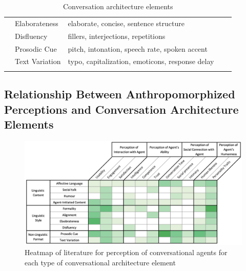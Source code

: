 \documentclass[sigconf,screen,review, anonymous]{acmart}
\newcommand{\cmt}[1]{}%
\begin{document}
\begin{table}[h]
{\begin{tabular}{@{}p{} | p{} | p{} | >{\centering}p{} | p{} @{}}
\\ \cline{2-5}
& Elaborateness & elaborate, concise, sentence structure & 6
& \cite{haas2022keep}\cmt{[78]}\cite{miehle2018exploring}\cmt{[51]}\cite{moilanen2022measuring}\cmt{[82]}\cite{roy2021users}\cmt{[71]}\cite{volkel2021manipulating}\cmt{[68]}\cite{volkel2022user}\cmt{[75]}
\\ \cline{2-5}
& Disfluency & fillers, interjections, repetitions & 6
& \cite{ceha2022expressive}\cmt{[77]}\cite{hu2021enhancing}\cmt{[56]}\cite{jeong2019exploring}\cmt{[10]}\cite{niewiadomski2013laugh}\cmt{[85]}\cite{wester2015artificial}\cmt{[14]}\cite{yang2021effect}\cmt{[72]}
\\ \Xhline{1.2pt}
\multirow{2}{*}{Non-Linguistic Format} & Prosodic Cue & pitch, intonation, speech rate, spoken accent & 12
& \cite{chan2021kinvoices}\cmt{[74]}\cite{choi2020nobody}\cmt{[54]}\cite{dubiel2020persuasive}\cmt{[60]}\cite{feijoo2021effects}\cmt{[70]}\cite{habler2019effects}\cmt{[63]}\cite{hu2021enhancing}\cmt{[56]}\cite{jestin2022effects}\cmt{[81]}\cite{kim2020can}\cmt{[24]}\cite{lubold2016effects}\cmt{[86]}\cite{misu2011toward}\cmt{[83]}\cite{tolmeijer2021female}\cmt{[62]}\cite{zhu2022effects}\cmt{[26]}
\\ \cline{2-5}
& Text Variation & typo, capitalization, emoticons, response delay & 9
& \cite{fadhil2018effect}\cmt{[52]}\cite{gnewuch2018faster}\cmt{[19]}\cite{gnewuch2018chatbot}\cmt{[21]}\cite{gnewuch2022opposing}\cmt{[20]}\cite{kim2019comparing}\cmt{[89]}\cite{seeger2021chatbots}\cmt{[35]}\cite{volkel2022user}\cmt{[75]}\cite{westerman2019believe}\cmt{[9]}\cite{wilhelm2022keep}\cmt{[28]}
\\ \Xhline{1.2pt}
\end{tabular}%
}
\caption{Conversation architecture elements}
\label{tab:cues}
\end{table}

\subsection{Relationship Between Anthropomorphized Perceptions and Conversation Architecture Elements}

\begin{figure}[]
  \centering
  \includegraphics[width=\textwidth]{fig-heatmap-impact.png}
  \caption{Heatmap of literature for perception of conversational agents for each type of conversational architecture element}
  \label{fig:heatmap-impact}
\end{figure}
\end{document}
